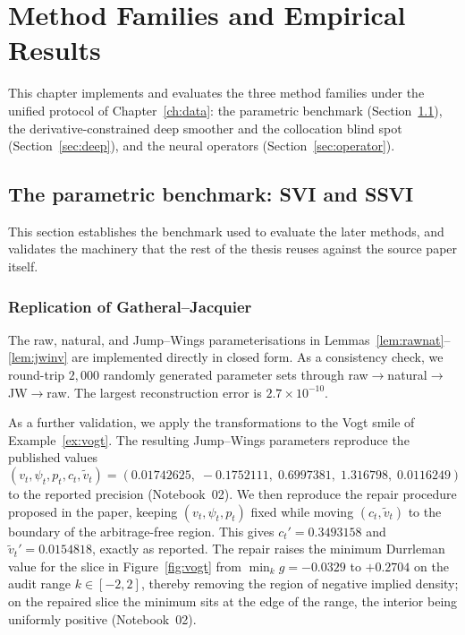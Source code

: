 \chapter{Method Families and Empirical Results}\label{ch:methods}


This chapter implements and evaluates the three method families under the unified protocol of
Chapter~\ref{ch:data}: the parametric benchmark (Section~\ref{sec:parametric}), the
derivative-constrained deep smoother and the collocation blind spot (Section~\ref{sec:deep}),
and the neural operators (Section~\ref{sec:operator}).

\section{The parametric benchmark: SVI and SSVI}\label{sec:parametric}

This section establishes the benchmark used to evaluate the later methods, and validates the
machinery that the rest of the thesis reuses against the source paper itself.

\subsection{Replication of Gatheral--Jacquier}

The raw, natural, and Jump--Wings parameterisations in
Lemmas~\ref{lem:rawnat}--\ref{lem:jwinv} are implemented directly in closed form. As a
consistency check, we round-trip $2{,}000$ randomly generated parameter sets through
raw$\to$natural$\to$JW$\to$raw. The largest reconstruction error is $2.7\times10^{-10}$.

As a further validation, we apply the transformations to the Vogt smile of
Example~\ref{ex:vogt}. The resulting Jump--Wings parameters reproduce the published values
\begin{equation}\label{eq:vogtjw}
(v_t,\psi_t,p_t,c_t,\tilde v_t)=
(0.01742625,\;-0.1752111,\;0.6997381,\;1.316798,\;0.0116249)
\end{equation}
to the reported precision (Notebook~02). We then reproduce the repair procedure
proposed in the paper, keeping $(v_t,\psi_t,p_t)$ fixed while moving $(c_t,\tilde v_t)$ to the
boundary of the arbitrage-free region. This gives $c_t'=0.3493158$ and $\tilde v_t'=0.0154818$,
exactly as reported. The repair raises the minimum Durrleman value for the slice in
Figure~\ref{fig:vogt} from $\min_k g=-0.0329$ to $+0.2704$ on the audit range $k\in[-2,2]$, thereby removing the
region of negative implied density; on the repaired slice the minimum sits at the edge of the
range, the interior being uniformly positive (Notebook~02).

